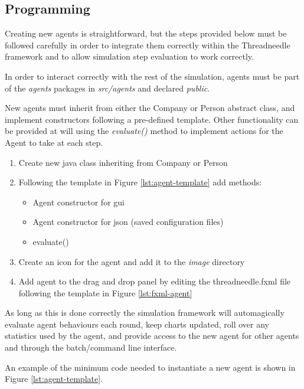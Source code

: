 \documentclass[10pt,oneside,openright, a4paper]{memoir}
\begin{document}
\subsection{Programming}
Creating new agents is straightforward, but the steps provided below must
be followed carefully in order to integrate them correctly within the 
Threadneedle framework and to allow simulation step evaluation to work 
correctly.
\par
In order to interact correctly with the rest of the simulation,
agents must be part of the \emph{agents} packages in \emph{src/agents}
and declared \emph{public}.
\par
New agents must inherit from either the Company or Person
abstract class, and implement constructors following a pre-defined
template. Other functionality can be provided at will 
using the \emph{evaluate()} method to implement actions for the Agent
to take at each step.
\begin{enumerate}
  \item Create new java class inheriting from Company or Person
  \item Following the template in Figure \ref{lst:agent-template} add methods:
  \begin{itemize}
     \item Agent constructor for gui
     \item Agent constructor for json (saved configuration files)
     \item evaluate()
  \end{itemize}
  \item Create an icon for the agent and add it to the \emph{image} directory
  \item Add agent to the drag and drop panel by editing the threadneedle.fxml file following the template in Figure \ref{lst:fxml-agent}

\end{enumerate}
As long
as this is done correctly the
simulation framework will automagically evaluate agent behaviours each round,
keep charts updated, roll over any statistics used by the agent, and provide
access to the new agent for other agents and through the batch/command line
interface.
\par
An example of the minimum code needed to instantiate a new agent is shown 
in Figure \ref{lst:agent-template}.

\end{document}

